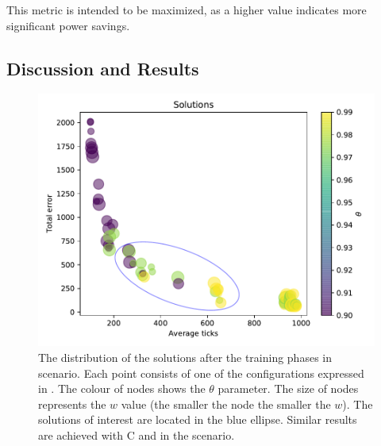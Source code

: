 This metric is intended to be maximized, 
 as a higher value indicates more significant power savings.
\subsection{Discussion and Results}\label{acsos2022:s:discussion:ac}
\begin{figure}
    \centering
    \includegraphics[width=0.5\linewidth]{papers/acsos2022/img//solution-g.pdf}
    \caption[Pareto front varying the $w$ parameter in the scheduling scenario]{The distribution of the solutions after the training phases in \swapscen{} scenario. 
        Each point consists of one of the configurations expressed in .
        The colour of nodes shows the $\theta$ parameter. 
        The size of nodes represents the $w$ value (the smaller the node the smaller the $w$). 
        The solutions of interest are located in the blue ellipse.
        Similar results are achieved with C and in the \multiswap{} scenario. 
    }
    \label{acsos2022:fig:solutions}
\end{figure}
